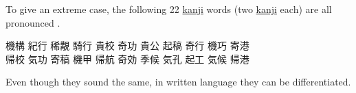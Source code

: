 To give an extreme case, the following 22 \hyperref[sec:Kanji]{kanji} words
(two \hyperref[sec:Kanji]{kanji} each) are all pronounced .

\begin{center}
{機構} {紀行} {稀覯} {騎行} {貴校} {奇功} {貴公} {起稿} {奇行} {機巧} {寄港}\\
{帰校} {気功} {寄稿} {機甲} {帰航} {奇効} {季候} {気孔} {起工} {気候} {帰港}
\end{center}

Even though they sound the same, in written language they can be
differentiated.

